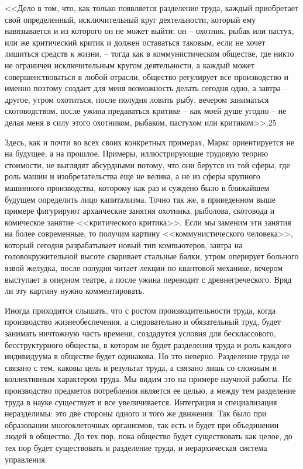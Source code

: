 \documentclass{book}
\begin{document}
<<Дело в том, что, как только появляется разделение труда, каждый приобретает свой определенный, исключительный круг деятельности, который ему навязывается и из которого он не может выйти: он -- охотник, рыбак или пастух, или же критический критик и должен оставаться таковым, если не хочет лишиться средств к жизни, -- тогда как в коммунисти­ческом обществе, где никто не ограничен исключительным кругом деятельности, а каждый может совершенствоваться в любой отрасли, общество регулирует все производство и именно поэтому создает для меня возможность делать сегод­ня одно, а завтра -- другое, утром охотиться, после полудня ловить рыбу, вечером заниматься скотоводством, после ужина предаваться критике -- как моей душе угодно -- не делая ме­ня в силу этого охотником, рыбаком, пастухом или крити­ком>>.25

Здесь, как и почти во всех своих конкретных примерах, Маркс ориентируется не на будущее, а на прошлое. Примеры, иллюстрирующие трудовую теорию стоимости, не выглядят абсурдными потому, что они берутся из той сферы, где роль машин и изобретательства еще не велика, а не из сферы круп­ного машинного производства, которому как раз и суждено было в ближайшем будущем определить лицо капитализма. Точно так же, в приведенном выше примере фигурируют арха­ические занятия охотника, рыболова, скотовода и комиче­ское занятие <<критического критика>>. Если мы заменим эти занятия на более современные, то получим картину <<коммуни­стического человека>>, который сегодня разрабатывает новый тип компьютеров, завтра на головокружительной высоте сва­ривает стальные балки, утром оперирует больного язвой же­лудка, после полудня читает лекции по квантовой механике, вечером выступает в оперном театре, а после ужина переводит с древнегреческого. Вряд ли эту картину нужно комментиро­вать.

Иногда приходится слышать, что с ростом производитель­ности труда, когда производство жизнеобеспечения, а следо­вательно и обязательный труд, будет занимать ничтожную часть времени, создадутся условия для бесклассового, бесструктур­ного общества, в котором не будет разделения труда и роль каждого индивидуума в обществе будет одинакова. Но это не­верно. Разделение труда не связано с тем, каковы цель и ре­зультат труда, а связано лишь со сложным и коллективным характером труда. Мы видим это на примере научной работы. Не производство предметов потребления является ее целью, а между тем разделение труда в науке существует и все увели­чивается. Интеграция и специализация неразделимы: это две стороны одного и того же движения. Так было при образова­нии многоклеточных организмов, так есть и будет при объе­динении людей в общество. До тех пор, пока общество будет существовать как целое, до тех пор будет существовать и раз­деление труда, и иерархическая система управления.
\end{document}
